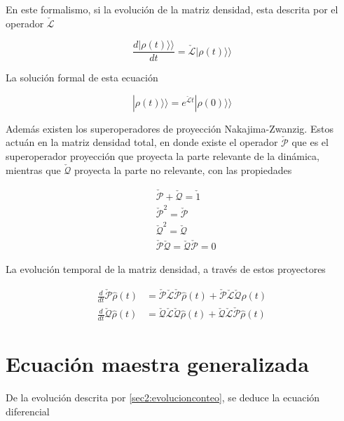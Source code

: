En este formalismo, si la evolución de la matriz densidad, esta descrita por el operador $\check{\mathcal{L}}$

\begin{equation*}
    \frac{d|\rho(t) \rangle \rangle}{dt} = \check{\mathcal{L}}|\rho(t) \rangle \rangle
\end{equation*}

La solución formal de esta ecuación

\begin{equation}
    |\rho(t)\rangle \rangle = e^{\check{\mathcal{L}}t}|\rho(0)\rangle \rangle 
    \label{sec2liouvilleformal}
\end{equation}

Además existen los superoperadores de proyección Nakajima-Zwanzig\cite{zwanzig1966statistical}. Estos actuán en la matriz densidad total, en donde existe el operador  $\check{\mathcal{P}}$ que es el superoperador proyección que proyecta la parte relevante de la dinámica, mientras que $\check{\mathcal{Q}}$ proyecta la parte no relevante, con las propiedades

\begin{align*}
    & \check{\mathcal{P}} + \check{\mathcal{Q}} = \check{1} \\
    & \check{\mathcal{P}}^{2} = \check{\mathcal{P}} \\
    & \check{\mathcal{Q}}^{2} = \check{\mathcal{Q}} \\
    & \check{\mathcal{P}}\check{\mathcal{Q}} = \check{\mathcal{Q}}\check{\mathcal{P}} = 0 
\end{align*}    

La evolución temporal de la matriz densidad, a través de estos proyectores

\begin{align*}
    \frac{d}{dt}\check{\mathcal{P}}\hat{\rho}(t) & = \check{\mathcal{P}}\check{\mathcal{L}}\check{\mathcal{P}}\hat{\rho}(t) + \check{\mathcal{P}}\check{\mathcal{L}}\check{\mathcal{Q}}\hat{\rho}(t) \\
    \frac{d}{dt}\check{\mathcal{Q}}\hat{\rho}(t) & = \check{\mathcal{Q}}\check{\mathcal{L}}\check{\mathcal{Q}}\hat{\rho}(t) + \check{\mathcal{Q}}\check{\mathcal{L}}\check{\mathcal{P}}\hat{\rho}(t)
\end{align*}

\label{sec2:superop}

\newpage

\section{Ecuación maestra generalizada}
De la evolución descrita por \ref{sec2:evolucionconteo}, se deduce la ecuación diferencial

